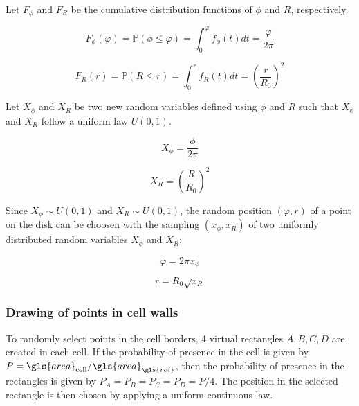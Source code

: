 \begin{appendix}
Let \( F_\phi \) and  \( F_R \) be the  cumulative distribution functions of \( \phi \) and \( R \), respectively.

\begin{equation}
  F_\phi(\varphi) =
    \mathbb{P}(\phi \leq \varphi) =
      \int_0^\varphi f_\phi(t) dt = \frac{\varphi }{2 \pi}
\end{equation}

\begin{equation}
  F_R(r) =
    \mathbb{P}(R \leq r) =
      \int_0^r f_R(t) dt = \left( \frac{r}{R_0} \right)^2
\end{equation}

\medskip

Let \( X_\phi \) and \( X_R \) be two new random variables defined using \( \phi \) and \( R \) such that \( X_\phi \) and \( X_R \) follow a uniform law \( U(0, 1) \).

\begin{equation}
  X_\phi =
    \frac{\phi}{2 \pi}
\end{equation}

\begin{equation}
  X_R =
    \left( \frac{R}{R_0} \right)^2
\end{equation}

\medskip

Since \( X_\phi \sim U(0, 1) \) and \( X_R \sim U(0, 1) \), the random position \( (\varphi, r)\) of a point on the disk can be choosen with the sampling \( ( x_\phi, x_R ) \) of two uniformly distributed random variables \( X_\phi \) and \( X_R \):

\begin{equation}\label{eq:circle-random-position-theta}
  \varphi =
    2 \pi x_\phi
\end{equation}

\begin{equation}\label{eq:circle-random-position-r}
  r =
    R_0 \sqrt{x_R}
\end{equation}

\subsubsection{Drawing of points in cell walls}\label{sec:cell-random-position}


To randomly select points in the cell borders, 4 virtual rectangles \( A, B, C, D \) are created in each cell. If the probability of presence in the cell is given by \( P = \gls{area}_{\text{cell}} / \gls{area}_{\gls{roi}} \), then the probability of presence in the rectangles is given by \( P_A = P_B = P_C = P_D = P / 4 \).
The position in the selected rectangle is then chosen by applying a uniform continuous law.


\end{appendix}
